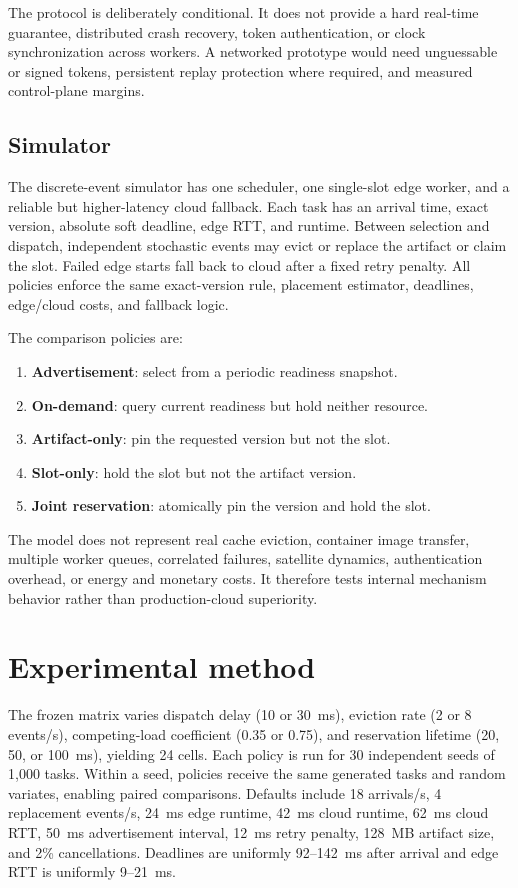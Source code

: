\documentclass[11pt,a4paper]{article}
\begin{document}
The protocol is deliberately conditional. It does not provide a hard real-time guarantee, distributed crash recovery, token authentication, or clock synchronization across workers. A networked prototype would need unguessable or signed tokens, persistent replay protection where required, and measured control-plane margins.

\subsection{Simulator}

The discrete-event simulator has one scheduler, one single-slot edge worker, and a reliable but higher-latency cloud fallback. Each task has an arrival time, exact version, absolute soft deadline, edge RTT, and runtime. Between selection and dispatch, independent stochastic events may evict or replace the artifact or claim the slot. Failed edge starts fall back to cloud after a fixed retry penalty. All policies enforce the same exact-version rule, placement estimator, deadlines, edge/cloud costs, and fallback logic.

The comparison policies are:
\begin{enumerate}
\item \textbf{Advertisement}: select from a periodic readiness snapshot.
\item \textbf{On-demand}: query current readiness but hold neither resource.
\item \textbf{Artifact-only}: pin the requested version but not the slot.
\item \textbf{Slot-only}: hold the slot but not the artifact version.
\item \textbf{Joint reservation}: atomically pin the version and hold the slot.
\end{enumerate}

The model does not represent real cache eviction, container image transfer, multiple worker queues, correlated failures, satellite dynamics, authentication overhead, or energy and monetary costs. It therefore tests internal mechanism behavior rather than production-cloud superiority.

\section{Experimental method}

The frozen matrix varies dispatch delay (10 or 30~ms), eviction rate (2 or 8 events/s), competing-load coefficient (0.35 or 0.75), and reservation lifetime (20, 50, or 100~ms), yielding 24 cells. Each policy is run for 30 independent seeds of 1,000 tasks. Within a seed, policies receive the same generated tasks and random variates, enabling paired comparisons. Defaults include 18 arrivals/s, 4 replacement events/s, 24~ms edge runtime, 42~ms cloud runtime, 62~ms cloud RTT, 50~ms advertisement interval, 12~ms retry penalty, 128~MB artifact size, and 2\% cancellations. Deadlines are uniformly 92--142~ms after arrival and edge RTT is uniformly 9--21~ms.
\end{document}

